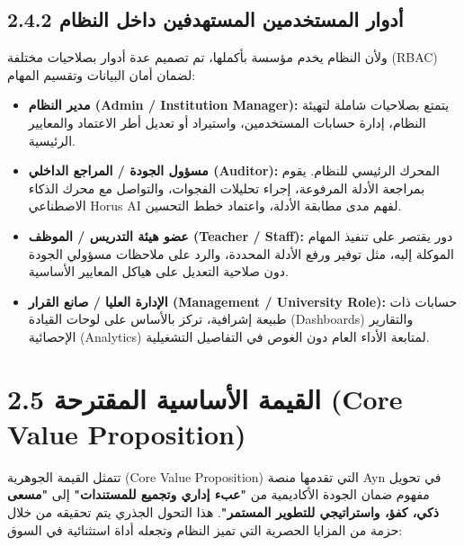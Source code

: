 \documentclass[12pt, a4paper]{report}
\begin{document}
\begin{english}
\subsection*{2.4.2 أدوار المستخدمين المستهدفين داخل النظام}
ولأن النظام يخدم مؤسسة بأكملها، تم تصميم عدة أدوار بصلاحيات مختلفة (RBAC) لضمان أمان البيانات وتقسيم المهام: \\
\begin{itemize}
\item \textbf{مدير النظام (Admin / Institution Manager):} يتمتع بصلاحيات شاملة لتهيئة النظام، إدارة حسابات المستخدمين، واستيراد أو تعديل أطر الاعتماد والمعايير الرئيسية.
\item \textbf{مسؤول الجودة / المراجع الداخلي (Auditor):} المحرك الرئيسي للنظام. يقوم بمراجعة الأدلة المرفوعة، إجراء تحليلات الفجوات، والتواصل مع محرك الذكاء الاصطناعي Horus AI لفهم مدى مطابقة الأدلة، واعتماد خطط التحسين.
\item \textbf{عضو هيئة التدريس / الموظف (Teacher / Staff):} دور يقتصر على تنفيذ المهام الموكلة إليه، مثل توفير ورفع الأدلة المحددة، والرد على ملاحظات مسؤولي الجودة دون صلاحية التعديل على هياكل المعايير الأساسية.
\item \textbf{الإدارة العليا / صانع القرار (Management / University Role):} حسابات ذات طبيعة إشرافية، تركز بالأساس على لوحات القيادة (Dashboards) والتقارير الإحصائية (Analytics) لمتابعة الأداء العام دون الغوص في التفاصيل التشغيلية.
\end{itemize}

\section*{2.5 القيمة الأساسية المقترحة (Core Value Proposition)}

تتمثل القيمة الجوهرية (Core Value Proposition) التي تقدمها منصة Ayn في تحويل مفهوم ضمان الجودة الأكاديمية من \textbf{"عبء إداري وتجميع للمستندات"} إلى \textbf{"مسعى ذكي، كفؤ، واستراتيجي للتطوير المستمر"}. هذا التحول الجذري يتم تحقيقه من خلال حزمة من المزايا الحصرية التي تميز النظام وتجعله أداة استثنائية في السوق: \\


\end{english}
\end{document}
